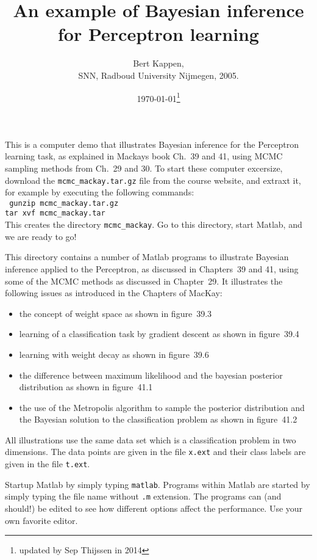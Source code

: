 \documentclass[a4paper]{article}
\title{An example of Bayesian inference for Perceptron learning}
\author{
	Bert Kappen, \\
	SNN, Radboud University Nijmegen, 2005.
}
\date{\today\footnote{updated by Sep Thijssen in 2014}}
\theoremstyle{definition}
\begin{document}
\maketitle


This is a computer demo that illustrates Bayesian inference for the Perceptron learning task, as explained in Mackays book Ch.~39 and 41, using MCMC sampling methods from Ch.~29 and 30. To start these computer excersize, download the \texttt{mcmc\_mackay.tar.gz} file from the course website, and extraxt it, for example by executing the following commands:
\medskip \\
\texttt{
	gunzip  mcmc\_mackay.tar.gz\\
	tar xvf mcmc\_mackay.tar
}\\

This creates the directory \texttt{mcmc\_mackay}. Go to this directory,
start Matlab, and we are ready to go!

This directory contains a number of Matlab programs to illustrate Bayesian inference applied to the Perceptron, as discussed in Chapters~39 and 41, using some of the MCMC methods as discussed in Chapter~29. It illustrates the following issues as introduced in the Chapters of MacKay: 
\begin{itemize}
\item the concept of weight space as shown in figure~39.3 
\item learning of a classification task by gradient descent as shown in
figure~39.4 
\item learning with weight decay as shown in figure~39.6 
\item the difference between maximum likelihood and the bayesian posterior
distribution as shown in figure~41.1 
\item the use of the Metropolis algorithm to sample the posterior
distribution and the Bayesian solution to the classification problem as
shown in figure~41.2 
\end{itemize}

All illustrations use the same data set which is a classification problem in two dimensions. The data points are given in the file \texttt{x.ext} and their class labels are given in the file \texttt{t.ext}.

Startup Matlab by simply typing \texttt{matlab}. Programs within Matlab are
started by simply typing the file name without \texttt{.m} extension. The
programs can (and should!) be edited to see how different options affect
the performance. Use your own favorite editor.\\
\end{document}
